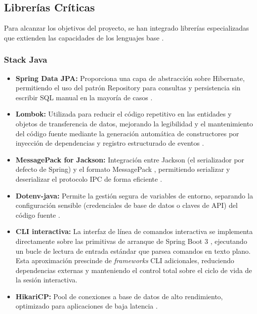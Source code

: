 \subsection{Librerías Críticas}

Para alcanzar los objetivos del proyecto, se han integrado librerías especializadas que extienden las capacidades de los lenguajes base \parencite{richards_software_2022}.

\subsubsection{Stack Java}

\begin{itemize}
    \item \textbf{Spring Data JPA:} Proporciona una capa de abstracción sobre Hibernate, permitiendo el uso del patrón Repository \parencite{gamma_design_1994} para consultas y persistencia sin escribir SQL manual en la mayoría de casos \parencite{spring_data_jpa_2024}.
    \item \textbf{Lombok:} Utilizada para reducir el código repetitivo en las entidades y objetos de transferencia de datos, mejorando la legibilidad y el mantenimiento del código fuente mediante la generación automática de constructores por inyección de dependencias y registro estructurado de eventos \parencite{richards_software_2022,lombok_project_2024}.
    \item \textbf{MessagePack for Jackson:} Integración entre Jackson (el serializador por defecto de Spring) y el formato MessagePack \parencite{furuhashi_msgpack_2013}, permitiendo serializar y deserializar el protocolo IPC de forma eficiente \parencite{pivotal_springboot_2024}.
    \item \textbf{Dotenv-java:} Permite la gestión segura de variables de entorno, separando la configuración sensible (credenciales de base de datos o claves de API) del código fuente \parencite{owasp_password_2024}.
    \item \textbf{CLI interactiva:} La interfaz de línea de comandos interactiva se implementa directamente sobre las primitivas de arranque de Spring Boot 3 \parencite{pivotal_springboot_2024}, ejecutando un bucle de lectura de entrada estándar que parsea comandos en texto plano. Esta aproximación prescinde de \textit{frameworks} CLI adicionales, reduciendo dependencias externas y manteniendo el control total sobre el ciclo de vida de la sesión interactiva. 
    \item \textbf{HikariCP:} Pool de conexiones a base de datos de alto rendimiento, optimizado para aplicaciones de baja latencia \parencite{wooldridge_hikaricp_2024}.
\end{itemize}

